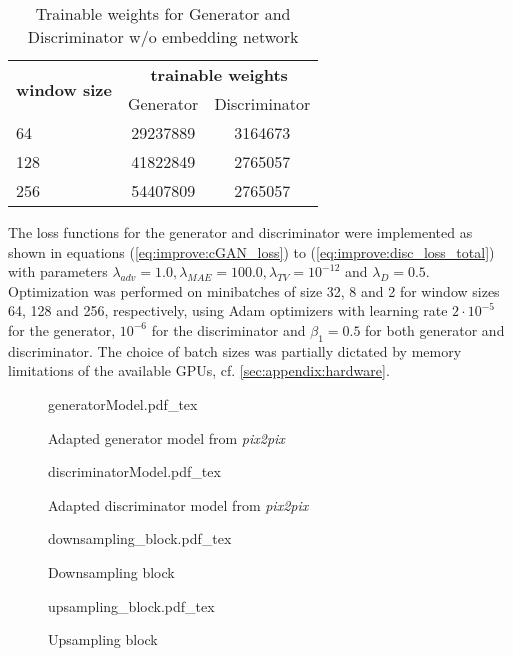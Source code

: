 \begin{table}[htbp]
\centering
\begin{tabular}{lcc}
\hline
\multirow{2}{*}{\textbf{window size}} & \multicolumn{2}{c}{\textbf{trainable weights}} \\
                                     & \multicolumn{1}{c}{Generator}            & \multicolumn{1}{c}{Discriminator}           \\ \hline
64                                   & \SI{29237889}{}             & \SI{3164673}{}                 \\
128                                  & \SI{41822849}{}             & \SI{2765057}{}                 \\
256                                  & \SI{54407809}{}             & \SI{2765057}{}              \\ \hline
\end{tabular}
\caption{Trainable weights for Generator and Discriminator w/o embedding network}
\label{tab:methods:gen_disc_params}
\end{table}

The loss functions for the generator and discriminator were implemented as shown in equations (\ref{eq:improve:cGAN_loss}) to (\ref{eq:improve:disc_loss_total})
with parameters $\lambda_\mathit{adv}=1.0, \lambda_\mathit{MAE}=100.0, \lambda_\mathit{TV}=10^{-12}$ and $\lambda_D=0.5$.
Optimization was performed on minibatches of size 32, 8 and 2 for window sizes 64, 128 and 256, respectively, 
using Adam optimizers with learning rate $2\cdot10^{-5}$ for the generator, $10^{-6}$ for the discriminator and $\beta_1=0.5$ for both generator and discriminator.
The choice of batch sizes was partially dictated by memory limitations of the available GPUs, cf. \cref{sec:appendix:hardware}.

\begin{figure}[p]
    \tiny
    {generatorModel.pdf_tex}
    \caption{Adapted generator model from \emph{pix2pix}} \label{fig:methods:GAN_arch:generator}
\end{figure}
\begin{figure}[p]
    \scriptsize
    \centering
    {discriminatorModel.pdf_tex}
    \caption{Adapted discriminator model from \emph{pix2pix}} \label{fig:methods:GAN_arch:discriminator}
\end{figure}
\begin{figure}[p]
    \scriptsize
    \centering
    {downsampling_block.pdf_tex}
    \caption{Downsampling block} \label{fig:methods:GAN_arch:downsampling}
\end{figure}
\begin{figure}[p]
    \scriptsize
    \centering
    {upsampling_block.pdf_tex}
    \caption{Upsampling block} \label{fig:methods:GAN_arch:upsampling}
\end{figure}

